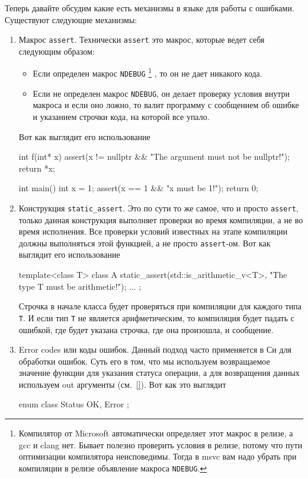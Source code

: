 Теперь давайте обсудим какие есть механизмы в языке для работы с ошибками.
Существуют следующие механизмы:
\begin{enumerate}
\item Макрос \verb"assert".
Технически \verb"assert" это макрос, которые ведет себя следующим образом:
\begin{itemize}
\item Если определен макрос \verb"NDEBUG"%
\footnote{Компилятор от Microsoft автоматически определяет этот макрос в релизе, а gcc и clang нет.
Бывает полезно проверить условия в релизе, потому что пути оптимизации компилятора неисповедимы.
Тогда в msvc вам надо убрать при компиляции в релизе объявление макроса \verb"NDEBUG".} , то он не дает никакого кода.

\item Если не определен макрос \verb"NDEBUG", он делает проверку условия внутри макроса и если оно ложно, то валит программу с сообщением об ошибке и указанием строчки кода, на которой все упало.
\end{itemize}
Вот как выглядит его использование
\begin{cppcode}
int f(int* x) {
  assert(x != nullptr && "The argument must not be nullptr!");
  return *x;
}

int main() {
  int x = 1;
  assert(x == 1 && "x must be 1!");
  return 0;
}
\end{cppcode}

\item Конструкция \verb"static_assert".
Это по сути то же самое, что и просто \verb"assert", только данная конструкция выполняет проверки во время компиляции, а не во время исполнения.
Все проверки условий известных на этапе компиляции должны выполняться этой функцией, а не просто \verb"assert"-ом.
Вот как выглядит его использование
\begin{cppcode}
template<class T>
class A {
  static_assert(std::is_arithmetic_v<T>, "The type T must be arithmetic!");
  ...
};
\end{cppcode}
Строчка в начале класса будет проверяться при компиляции для каждого типа \verb"T".
И если тип \verb"T" не является арифметическим, то компиляция будет падать с ошибкой, где будет указана строчка, где она произошла, и сообщение.

\item Error codes или коды ошибок.
Данный подход часто применяется в Си для обработки ошибок.
Суть его в том, что мы используем возвращаемое значение функции для указания статуса операции, а для возвращения данных используем out аргументы (см.~\ref{}).
Вот как это выглядит
\begin{cppcode}
enum class Status {
  OK, Error
};


\end{cppcode}
\end{enumerate}

